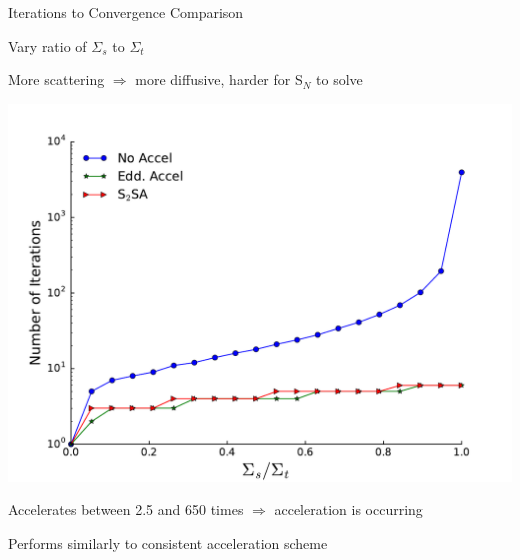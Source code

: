 \documentclass[10pt]{beamer}
\newcommand{\SN}{S$_N$\xspace}
\begin{document}
\begin{frame}{Iterations to Convergence Comparison}

    Vary ratio of $\Sigma_s$ to $\Sigma_t$ 

    More scattering $\Rightarrow$ more diffusive, harder for \SN to solve 

    \centerline{\includegraphics[width=.55\paperwidth]{figs/accel.pdf}}

    Accelerates between 2.5 and 650 times $\Rightarrow$ acceleration is occurring 

    Performs similarly to consistent acceleration scheme 

\end{frame}
\end{document}
